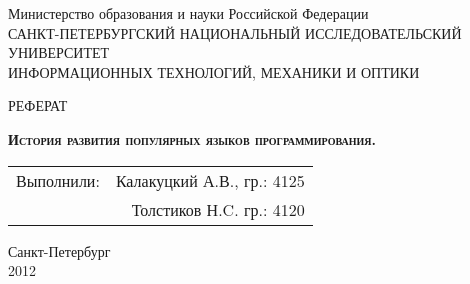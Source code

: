 \begin{titlepage}
\newpage

\begin{center}
Министерство образования и науки Российской Федерации\\ \vspace{1em}
САНКТ-ПЕТЕРБУРГСКИЙ НАЦИОНАЛЬНЫЙ ИССЛЕДОВАТЕЛЬСКИЙ УНИВЕРСИТЕТ\\
ИНФОРМАЦИОННЫХ ТЕХНОЛОГИЙ, МЕХАНИКИ И ОПТИКИ\\
\hrulefill
\end{center}



\vspace{8em}

\begin{center}
\Large РЕФЕРАТ
\end{center}

\vspace{2.5em}

\begin{center}
\textsc{\textbf{История развития популярных языков программирования.}}
\end{center}

\vspace{15em}

\begin{flushright}
\begin{tabular}{lr}
Выполнили:& Калакуцкий А.В., гр.: 4125\\
&Толстиков Н.C. гр.: 4120\\
\end{tabular}
\vspace{1.5em}


\end{flushright}

\vspace{\fill}

\begin{center}
Санкт-Петербург \\ 2012
\end{center}

\end{titlepage}